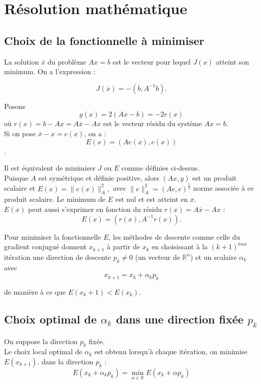 \documentclass[12,french]{report}
\begin{document}
\section{Résolution mathématique}

\subsection{Choix de la fonctionnelle à minimiser}
La solution $\overline{x}$ du problème $Ax = b$ est le vecteur pour lequel $J(x)$ atteint son minimum. On a l'expression :

$$J(\overline{x})=-(b,A^{-1}b).$$

Posons 
$$g(x)=2(Ax-b)=-2r(x)$$
où $r(x)=b-Ax=A\overline{x}-Ax$ est le vecteur résidu du système $Ax = b$.\\

Si on pose $\overline{x}-x=e(x)$, on a :
$$E(x) = (A e(x), e(x))$$.

Il est équivalent de minimiser $J$ ou $E$ comme définies ci-dessus.\\

Puisque $A$ est symétrique et définie positive, alors $(Ax,y)$ est un produit scalaire et
$E(x) =	\|e(x)\|_{A}^{2},$ avec $\|e\|_{A}^{2} = (Ae, e)^{\frac{1}{2}}$ norme associée à ce produit scalaire. Le minimum de $E$ est nul et est atteint en $\overline{x}$.\\

$E(x)$ peut aussi s’exprimer en fonction du résidu $r(x) = A\overline{x}-Ax$ :
$$E(x) = (r(x), A^{-1}r(x)).$$

Pour minimiser la fonctionnelle $E$, les méthodes de descente comme celle du gradient conjugué donnent $x_{k+1}$ à partir de $x_{k}$ en choisissant à la $(k + 1)^{ème}$ itération une direction de descente $p_{k}\neq 0$ (un vecteur de $\mathbb{R}^{n}$) et un scalaire $\alpha_{k}$ avec
$$x_{k+1} = x_k + \alpha_{k}p_{k}$$

de manière à ce que $E(x_{k}+1 ) < E(x_{k}).$

\subsection{Choix optimal de $\alpha_{k}$ dans une direction fixée $p_{k}$}

On suppose la direction $p_{k}$ fixée.\\

Le choix local optimal de $\alpha_{k}$ est obtenu lorsqu'à chaque itération, on minimise $E(x_{k+1}).$ dans la direction $p_{k}$ :
$$E(x_{k}+\alpha_{k} p_{k})=\min_{\alpha\in\mathbb{R}}E(x_{k}+\alpha p_{k})$$
\end{document}
